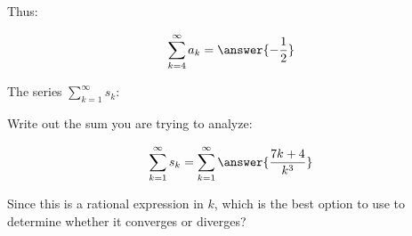 \documentclass{ximera}
\begin{document}
\begin{exercise}
\begin{exercise}
\begin{exercise}
\begin{exercise}
Thus:

\[
\sum_{k=4}^{\infty} a_k = \answer{-\frac{1}{2}}
\]

\begin{exercise}
The series $\sum_{k=1}^{\infty} s_k$: 

\begin{multipleChoice}
\end{multipleChoice}

\begin{hint}
Write out the sum you are trying to analyze:

\[
\sum_{k=1}^{\infty} s_k = \sum_{k=1}^{\infty} \answer{\frac{7k+4}{k^3}}
\]

Since this is a rational expression in $k$, which is the best option to use to determine whether it converges or diverges?

\begin{multipleChoice}
\end{multipleChoice}

\end{hint}
\end{exercise}
\end{exercise}
\end{exercise}
\end{exercise}
\end{exercise}
\end{document}
